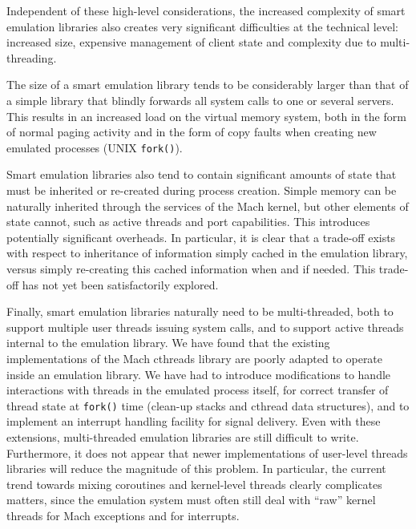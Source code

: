 Independent of these high-level considerations, the increased
complexity of smart emulation libraries also creates very significant
difficulties at the technical level: increased size, expensive
management of client state and complexity due to multi-threading.

The size of a smart emulation library tends to be considerably larger
than that of a simple library that blindly forwards all system calls to
one or several servers. This results in an increased load on the
virtual memory system, both in the form of normal paging activity and
in the form of copy faults when creating new emulated processes (UNIX
{\tt fork()}).


Smart emulation libraries also tend to contain significant amounts of
state that must be inherited or re-created during process creation.
Simple memory can be naturally inherited through the services of the
Mach kernel, but other elements of state cannot, such as active
threads and port capabilities. This introduces potentially significant
overheads.  In particular, it is clear that a trade-off exists with
respect to inheritance of information simply cached in the emulation
library, versus simply re-creating this cached information when and if
needed.  This trade-off has not yet been satisfactorily explored.

Finally, smart emulation libraries naturally need to be
multi-threaded, both to support multiple user threads issuing system
calls, and to support active threads internal to the emulation
library. We have found that the existing implementations of the Mach
cthreads library are poorly adapted to operate inside an emulation
library. We have had to introduce modifications to handle interactions
with threads in the emulated process itself, for correct transfer of
thread state at {\tt fork()} time (clean-up stacks and cthread data
structures), and to implement an interrupt handling facility for
signal delivery.  Even with these extensions, multi-threaded emulation
libraries are still difficult to write.  Furthermore, it does not
appear that newer implementations of user-level threads libraries will
reduce the magnitude of this problem. In particular, the current trend
towards mixing coroutines and kernel-level threads clearly complicates
matters, since the emulation system must often still deal with ``raw''
kernel threads for Mach exceptions and for interrupts.

